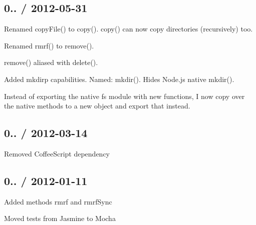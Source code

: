 \subsection*{0.. / 2012-\/05-\/31 }


\begin{DoxyItemize}
\item Renamed {\ttfamily copy\+File()} to {\ttfamily copy()}. {\ttfamily copy()} can now copy directories (recursively) too.
\item Renamed {\ttfamily rmrf()} to {\ttfamily remove()}.
\item {\ttfamily remove()} aliased with {\ttfamily delete()}.
\item Added {\ttfamily mkdirp} capabilities. Named\+: {\ttfamily mkdir()}. Hides Node.\+js native {\ttfamily mkdir()}.
\item Instead of exporting the native {\ttfamily fs} module with new functions, I now copy over the native methods to a new object and export that instead.
\end{DoxyItemize}

\subsection*{0.. / 2012-\/03-\/14 }


\begin{DoxyItemize}
\item Removed Coffee\+Script dependency
\end{DoxyItemize}

\subsection*{0.. / 2012-\/01-\/11 }


\begin{DoxyItemize}
\item Added methods rmrf and rmrf\+Sync
\item Moved tests from Jasmine to Mocha 
\end{DoxyItemize}